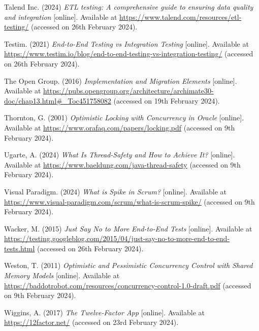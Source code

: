 \noindent Talend Inc. (2024) \textit{ETL testing: A comprehensive guide to ensuring data quality and integration} [online]. Available at \url{https://www.talend.com/resources/etl-testing/} (accessed on 26th February 2024).
\vspace{0.2cm}

\noindent Testim. (2021) \textit{End-to-End Testing vs Integration Testing} [online]. Available at \url{https://www.testim.io/blog/end-to-end-testing-vs-integration-testing/} (accessed on 26th February 2024).
\vspace{0.2cm}

\noindent The Open Group. (2016) \textit{Implementation and Migration Elements} [online]. Available at \url{https://pubs.opengroup.org/architecture/archimate30-doc/chap13.html#_Toc451758082} (accessed on 19th February 2024).
\vspace{0.2cm}

\noindent Thornton, G. (2001) \textit{Optimistic Locking with Concurrency in Oracle} [online]. Available at \url{https://www.orafaq.com/papers/locking.pdf} (accessed on 9th February 2024).
\vspace{0.2cm}

\noindent Ugarte, A. (2024) \textit{What Is Thread-Safety and How to Achieve It?} [online]. Available at \url{https://www.baeldung.com/java-thread-safety} (accessed on 9th February 2024).
\vspace{0.2cm}

\noindent Visual Paradigm. (2024) \textit{What is Spike in Scrum?} [online]. Available at \url{https://www.visual-paradigm.com/scrum/what-is-scrum-spike/} (accessed on 9th February 2024).
\vspace{0.2cm}

\noindent Wacker, M. (2015) \textit{Just Say No to More End-to-End Tests} [online]. Available at \url{https://testing.googleblog.com/2015/04/just-say-no-to-more-end-to-end-tests.html} (accessed on 26th February 2024).
\vspace{0.2cm}

\noindent Weston, T. (2011) \textit{Optimistic and Pessimistic Concurrency Control with Shared Memory Models} [online]. Available at \url{https://baddotrobot.com/resources/concurrency-control-1.0-draft.pdf} (accessed on 9th February 2024).
\vspace{0.2cm}

\noindent Wiggins, A. (2017) \textit{The Twelve-Factor App} [online]. Available at \url{https://12factor.net/} (accessed on 23rd February 2024).
\vspace{0.2cm}

